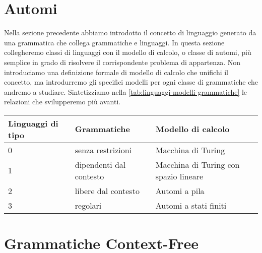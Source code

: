 \section{Automi}\label{sec:automi}

Nella sezione precedente abbiamo introdotto il concetto di linguaggio generato da una grammatica che collega grammatiche
e linguaggi.
In questa sezione collegheremo classi di linguaggi con il modello di calcolo, o classe di automi, più semplice in grado di
risolvere il corrispondente problema di appartenza.
Non introduciamo una definizione formale di modello di calcolo che unifichi il concetto, ma introdurremo gli specifici
modelli per ogni classe di grammatiche che andremo a studiare.
Sintetizziamo nella \cref{tab:linguaggi-modelli-grammatiche} le relazioni che svilupperemo più avanti.


\begin{table*}[h!]\label{tab:linguaggi-modelli-grammatiche}
	\caption{Grammatiche, linguaggi e modelli di calcolo}
	\begin{tabular}{p{2.8cm} p{4.0cm} p{7.0cm}}
		\toprule
		Linguaggi di tipo   & Grammatiche   & Modello di calcolo \\
		\midrule
		0   & senza restrizioni       & Macchina di Turing        \\
		1     & dipendenti dal contesto     & Macchina di Turing con spazio lineare  \\
		2   & libere dal contesto     & Automi a pila      \\
		3   & regolari     & Automi a stati finiti      \\
		\bottomrule
	\end{tabular}
\end{table*}




\section{Grammatiche Context-Free}\label{sec:CFG}


